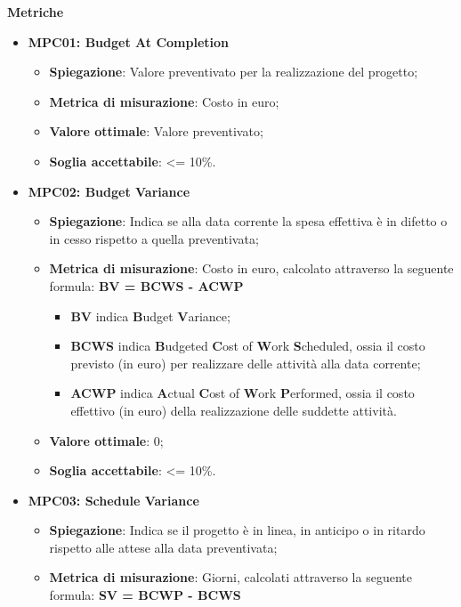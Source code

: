 \textbf{Metriche}
\begin{itemize}
    \item \textbf{MPC01: Budget At Completion}
    \begin{itemize}
        \item \textbf{Spiegazione}: Valore preventivato per la realizzazione del progetto;
        \item \textbf{Metrica di misurazione}: Costo in euro;
        \item \textbf{Valore ottimale}: Valore preventivato;
        \item \textbf{Soglia accettabile}: <= 10\%.
    \end{itemize}
    \item \textbf{MPC02: Budget Variance}
    \begin{itemize}
        \item \textbf{Spiegazione}: Indica se alla data corrente la spesa effettiva è in difetto o in cesso rispetto a quella preventivata;
        \item \textbf{Metrica di misurazione}: Costo in euro, calcolato attraverso la seguente formula: \textbf{BV = BCWS - ACWP}
        \begin{itemize}
            \item \textbf{BV} indica \textbf{B}udget \textbf{V}ariance;
            \item \textbf{BCWS} indica \textbf{B}udgeted \textbf{C}ost of \textbf{W}ork \textbf{S}cheduled, ossia il costo previsto (in euro) per realizzare delle attività alla data corrente;
            \item \textbf{ACWP} indica \textbf{A}ctual \textbf{C}ost of \textbf{W}ork \textbf{P}erformed, ossia il costo effettivo (in euro) della realizzazione delle suddette attività.
        \end{itemize}
        \item \textbf{Valore ottimale}: 0;
        \item \textbf{Soglia accettabile}: <= 10\%.
    \end{itemize}
    \item \textbf{MPC03: Schedule Variance}
    \begin{itemize}
        \item \textbf{Spiegazione}: Indica se il progetto è in linea, in anticipo o in ritardo rispetto alle attese alla data preventivata;
        \item \textbf{Metrica di misurazione}: Giorni, calcolati attraverso la seguente formula: \textbf{SV = BCWP - BCWS}

\end{itemize}
\end{itemize}
